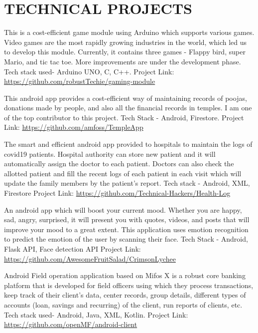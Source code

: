 \documentclass[11pt,a4paper,sans]{moderncv}        %
\begin{document}
\section{TECHNICAL PROJECTS}

{This is a cost-efficient game module using Arduino which supports various games. Video games are the most
rapidly growing industries in the world, which led us to develop this module. Currently, it contains three games - Flappy bird, super Mario, and tic tac toe. More improvements are under the development phase. Tech stack used- Arduino UNO, C, C++. Project Link: {\newline}
\url{https://github.com/robustTechie/gaming-module}}{}


{This android app provides a cost-efficient way of maintaining records of poojas, donations made by people, and
also all the financial records in temples. I am one of the top contributor to this project. Tech Stack - Android, Firestore. Project Link: {\newline}
\url{https://github.com/amfoss/TempleApp}}{}

{The smart and efficient android app provided to hospitals to maintain the logs of covid19 patients. Hospital
authority can store new patient and it will automatically assign the doctor to each patient. Doctors can also check the allotted patient and fill the recent logs of each patient in each visit which will update the family members by the patient’s report. Tech stack - Android, XML, Firestore Project Link: {\newline}
\url{https://github.com/Technical-Hackers/Health-Log}}{}

{An android app which will boost your current mood. Whether you are happy, sad, angry, surprised, it will present
you with quotes, videos, and posts that will improve your mood to a great extent. This application uses emotion recognition to predict the emotion of the user by scanning their face. Tech Stack - Android, Flask API, Face detection API Project Link: {\newline}
\url{https://github.com/AwesomeFruitSalad/CrimsonLychee}}{}

{Android Field operation application based on Mifos X is a robust core banking platform that is developed for field officers using which they process transactions, keep track of their client’s data, center records, group details, different types of accounts (loan, savings and recurring) of the client, run reports of clients, etc. Tech stack used- Android, Java, XML, Kotlin. Project Link: {\newline} 
\url{https://github.com/openMF/android-client}}{}  %
\end{document}
